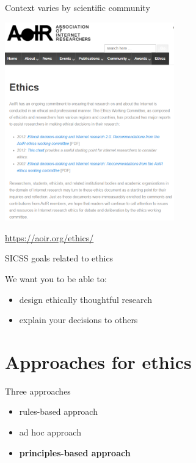 \documentclass{beamer}
\def\vf{\vfill}
\begin{document}
\begin{frame}{Context varies by scientific community}

\begin{center}
	\includegraphics[width=0.55\textwidth]{figures/aoir_ethics.PNG}
\end{center}

\vf
\url{https://aoir.org/ethics/}
\end{frame}


\begin{frame}{SICSS goals related to ethics}

We want you to be able to:
\begin{itemize}
\item design ethically thoughtful research 
\item explain your decisions to others
\end{itemize}
 
\end{frame}


\section{Approaches for ethics}
\begin{frame}{Three approaches}


\begin{itemize}
\item rules-based approach
\item ad hoc approach
\item \textbf{principles-based approach}
\end{itemize}

\end{frame}
\end{document}
